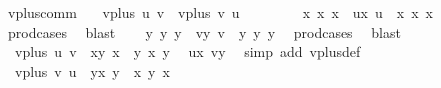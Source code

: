 \begin{isabellebody}
%
\endisadelimproof
\isanewline
\isanewline
{}\isamarkupfalse%
\ vplus{\isacharunderscore}{\kern0pt}comm{\isacharcolon}{\kern0pt}\isanewline
\ \ \ {\isachardoublequoteopen}vplus\ u\ v\ {\isacharequal}{\kern0pt}\ vplus\ v\ u{\isachardoublequoteclose}\ \ \isanewline
%
\isadelimproof
%
\endisadelimproof
%
\isatagproof
{}\isamarkupfalse%
\ {\isacharminus}{\kern0pt}\ \isanewline
\ \ \isamarkupfalse%
\ x{}\ x{}\ x{}\ \ ux{\isacharcolon}{\kern0pt}\ {\isachardoublequoteopen}u\ {\isacharequal}{\kern0pt}\ {\isacharparenleft}{\kern0pt}x{}{\isacharcomma}{\kern0pt}\ x{}{\isacharcomma}{\kern0pt}\ x{}{\isacharparenright}{\kern0pt}{\isachardoublequoteclose}\ \isamarkupfalse%
\ prod{\isacharunderscore}{\kern0pt}cases{}\ \isamarkupfalse%
\ blast\isanewline
\ \ \isamarkupfalse%
\ y{}\ y{}\ y{}\ \ vy{\isacharcolon}{\kern0pt}\ {\isachardoublequoteopen}v\ {\isacharequal}{\kern0pt}\ {\isacharparenleft}{\kern0pt}y{}{\isacharcomma}{\kern0pt}\ y{}{\isacharcomma}{\kern0pt}\ y{}{\isacharparenright}{\kern0pt}{\isachardoublequoteclose}\ \isamarkupfalse%
\ prod{\isacharunderscore}{\kern0pt}cases{}\ \isamarkupfalse%
\ blast\isanewline
\ \ \isamarkupfalse%
\ {}{\isacharcolon}{\kern0pt}\ {\isachardoublequoteopen}vplus\ u\ v\ {\isacharequal}{\kern0pt}\ {\isacharparenleft}{\kern0pt}x{}{\isacharplus}{\kern0pt}y{}{\isacharcomma}{\kern0pt}\ x{}\ {\isacharplus}{\kern0pt}\ y{}{\isacharcomma}{\kern0pt}\ x{}\ {\isacharplus}{\kern0pt}y{}{\isacharparenright}{\kern0pt}{\isachardoublequoteclose}\ \isamarkupfalse%
\ ux\ vy\ \isamarkupfalse%
\ {\isacharparenleft}{\kern0pt}simp\ add{\isacharcolon}{\kern0pt}\ vplus{\isacharunderscore}{\kern0pt}def{\isacharparenright}{\kern0pt}\isanewline
\ \ \isamarkupfalse%
\ {}{\isacharcolon}{\kern0pt}\ {\isachardoublequoteopen}vplus\ v\ u\ {\isacharequal}{\kern0pt}\ {\isacharparenleft}{\kern0pt}y{}{\isacharplus}{\kern0pt}x{}{\isacharcomma}{\kern0pt}\ y{}\ {\isacharplus}{\kern0pt}\ x{}{\isacharcomma}{\kern0pt}\ y{}\ {\isacharplus}{\kern0pt}x{}{\isacharparenright}{\kern0pt}{\isachardoublequoteclose}\ \isamarkupfalse%

\end{isabellebody}
